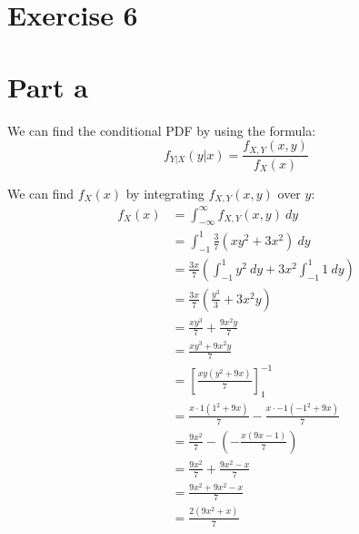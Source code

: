 \section{Exercise 6}

\section{Part a}

We can find the conditional PDF by using the formula:
\[
	f_{Y|X}(y|x) = \frac{f_{X,Y}(x,y)}{f_X(x)}
\]

We can find $f_X(x)$ by integrating $f_{X,Y}(x,y)$ over $y$:
\begin{align*}
	f_X(x) & = \int_{-\infty}^{\infty} f_{X,Y}(x,y)\ dy                                \\
	       & = \int_{-1}^{1} \frac{3}{7}(xy^2+3x^2)\ dy                                \\
	       & = \frac{3x}{7} \left(\int_{-1}^{1} y^2\ dy+3x^2\int_{-1}^{1} 1\ dy\right) \\
	       & = \frac{3x}{7} \left(\frac{y^3}{3}+3x^2y\right)                           \\
	       & = \frac{xy^3}{7}+\frac{9x^2y}{7}                                          \\
	       & = \frac{xy^3 + 9x^2y}{7}                                                  \\
	       & = \left[\frac{xy (y^2 + 9x)}{7}\right]^{-1}_1                             \\
	       & = \frac{x\cdot 1 (1^2 + 9x)}{7} - \frac{x\cdot -1 (-1^2 + 9x)}{7}         \\
	       & = \frac{9x^2}{7} - \left(-\frac{x (9x-1)}{7}\right)                       \\
	       & = \frac{9x^2}{7} + \frac{9x^2-x}{7}                                       \\
	       & = \frac{9x^2 + 9x^2-x}{7}                                                 \\
	       & = \frac{2(9x^2+x)}{7}                                                     \\
\end{align*}

